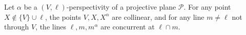 Let $\alpha$ be a $(V,\ell)$-perspectivity of a projective plane $\mathcal{P}$. For any point $X \notin \{V\} \cup \ell$, the points $V, X, X^\alpha$ are collinear, and for any line $m \neq \ell$ not through $V$, the lines $\ell, m, m^\alpha$ are concurrent at $\ell \cap m$.
